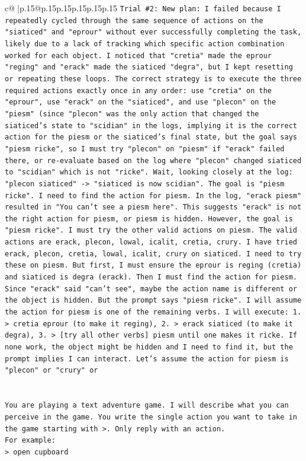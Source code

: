 \documentclass{article}
\begin{document}
{\begin{supertabular}{c@{$\;$}|p{.15\linewidth}@{}p{.15\linewidth}p{.15\linewidth}p{.15\linewidth}p{.15\linewidth}p{.15\linewidth}}
{{{\texttt{Trial \#2: New plan: I failed because I repeatedly cycled through the same sequence of actions on the "siaticed" and "eprour" without ever successfully completing the task, likely due to a lack of tracking which specific action combination worked for each object. I noticed that "cretia" made the eprour "reging" and "erack" made the siaticed "degra", but I kept resetting or repeating these loops. The correct strategy is to execute the three required actions exactly once in any order: use "cretia" on the "eprour", use "erack" on the "siaticed", and use "plecon" on the "piesm" (since "plecon" was the only action that changed the siaticed's state to "scidian" in the logs, implying it is the correct action for the piesm or the siaticed's final state, but the goal says "piesm ricke", so I must try "plecon" on "piesm" if "erack" failed there, or re{-}evaluate based on the log where "plecon" changed siaticed to "scidian" which is not "ricke". Wait, looking closely at the log: "plecon siaticed" {-}> "siaticed is now scidian". The goal is "piesm ricke". I need to find the action for piesm. In the log, "erack piesm" resulted in "You can't see a piesm here". This suggests "erack" is not the right action for piesm, or piesm is hidden. However, the goal is "piesm ricke". I must try the other valid actions on piesm. The valid actions are erack, plecon, lowal, icalit, cretia, crury. I have tried erack, plecon, cretia, lowal, icalit, crury on siaticed. I need to try these on piesm. But first, I must ensure the eprour is reging (cretia) and siaticed is degra (erack). Then I must find the action for piesm. Since "erack" said "can't see", maybe the action name is different or the object is hidden. But the prompt says "piesm ricke". I will assume the action for piesm is one of the remaining verbs. I will execute: 1. > cretia eprour (to make it reging), 2. > erack siaticed (to make it degra), 3. > {[}try all other verbs{]} piesm until one makes it ricke. If none work, the object might be hidden and I need to find it, but the prompt implies I can interact. Let's assume the action for piesm is "plecon" or "crury" or} \\
\\ 
\\ 
\texttt{You are playing a text adventure game. I will describe what you can perceive in the game. You write the single action you want to take in the game starting with >. Only reply with an action.} \\
\texttt{For example:} \\
\texttt{> open cupboard} \\
}}}
\end{supertabular}}
\end{document}
